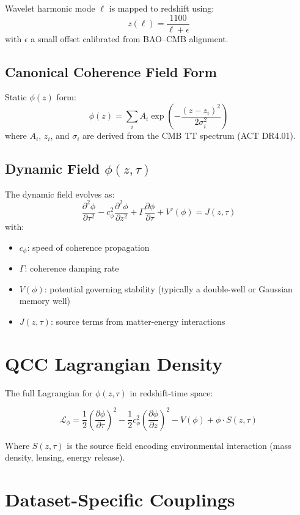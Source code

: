 \documentclass[11pt]{article}
\begin{document}
Wavelet harmonic mode $\ell$ is mapped to redshift using:
\[
z(\ell) = \frac{1100}{\ell + \epsilon}
\]
with $\epsilon$ a small offset calibrated from BAO–CMB alignment.

\subsection{Canonical Coherence Field Form}

Static $\phi(z)$ form:
\[
\phi(z) = \sum_{i} A_i \exp\left(-\frac{(z - z_i)^2}{2\sigma_i^2}\right)
\]
where $A_i$, $z_i$, and $\sigma_i$ are derived from the CMB TT spectrum (ACT DR4.01).

\subsection{Dynamic Field $\phi(z, \tau)$}

The dynamic field evolves as:
\[
\frac{\partial^2 \phi}{\partial \tau^2} - c_\phi^2 \frac{\partial^2 \phi}{\partial z^2} + \Gamma \frac{\partial \phi}{\partial \tau} + V'(\phi) = J(z, \tau)
\]
with:
\begin{itemize}
    \item $c_\phi$: speed of coherence propagation
    \item $\Gamma$: coherence damping rate
    \item $V(\phi)$: potential governing stability (typically a double-well or Gaussian memory well)
    \item $J(z, \tau)$: source terms from matter-energy interactions
\end{itemize}

\section{QCC Lagrangian Density}

The full Lagrangian for $\phi(z, \tau)$ in redshift-time space:

\[
\mathcal{L}_\phi = \frac{1}{2} \left( \frac{\partial \phi}{\partial \tau} \right)^2 
- \frac{1}{2} c_\phi^2 \left( \frac{\partial \phi}{\partial z} \right)^2 
- V(\phi) + \phi \cdot S(z, \tau)
\]

Where $S(z, \tau)$ is the source field encoding environmental interaction (mass density, lensing, energy release).

\section{Dataset-Specific Couplings}
\end{document}
